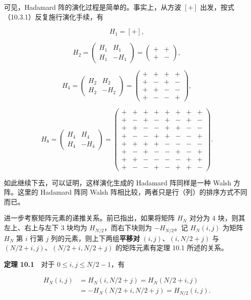 \documentclass[
  10pt,
  fontset=fandol]{ctexart}
\begin{document}
可见，Hadamard 阵的演化过程是简单的。事实上，从方波 \([+]\) 出发，按式（10.3.1）反复施行演化手续，有

\[
H_1=[+],
\]

\[
H_2=\begin{pmatrix}H_1&H_1\\H_1&-H_1\end{pmatrix}=\begin{pmatrix}+&+\\+&-\end{pmatrix},
\]

\[
H_4=\begin{pmatrix}H_2&H_2\\H_2&-H_2\end{pmatrix}=\begin{pmatrix}
+&+&+&+\\
+&-&+&-\\
+&+&-&-\\
+&-&-&+
\end{pmatrix},
\]

\[
H_8=\begin{pmatrix}H_4&H_4\\H_4&-H_4\end{pmatrix}=\begin{pmatrix}
+&+&+&+&+&+&+&+\\
+&-&+&-&+&-&+&-\\
+&+&-&-&+&+&-&-\\
+&-&-&+&+&-&-&+\\
+&+&+&+&-&-&-&-\\
+&-&+&-&-&+&-&+\\
+&+&-&-&-&-&+&+\\
+&-&-&+&-&+&+&-
\end{pmatrix}.
\]

如此继续下去，可以证明，这样演化生成的 Hadamard 阵同样是一种 Walsh 方阵。这里的 Hadamard 阵同 Walsh 阵相比较，两者只是行（列）的排序方式不同而已。

进一步考察矩阵元素的递推关系。前已指出，如果将矩阵 \(H_N\) 对分为 4 块，则其左上、右上与左下 3 块均为 \(H_{N/2}\)，而右下块则为 \(-H_{N/2}\)。记 \(H_N(i,j)\) 为矩阵 \(H_N\) 第 \(i\) 行第 \(j\) 列的元素，则上下两组\textbf{平移对} \((i,j)\)、\((i,N/2+j)\) 与 \((N/2+i,j)\)、\((N/2+i,N/2+j)\) 的矩阵元素有定理 10.1 所述的关系。

\textbf{定理 10.1}　对于 \(0\leqslant i,j\leqslant N/2-1\)，有

\[
\begin{aligned}
H_N(i,j)&=H_N(i,N/2+j)=H_N(N/2+i,j)\\
&=-H_N(N/2+i,N/2+j)=H_{N/2}(i,j).
\end{aligned}
\]
\end{document}
